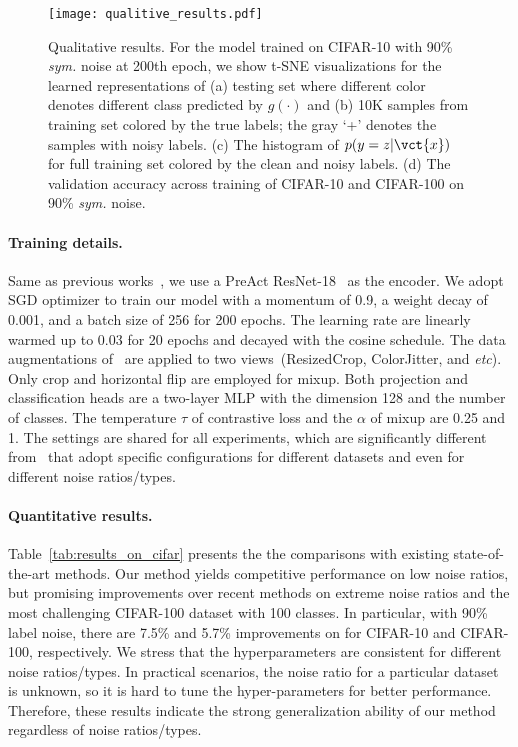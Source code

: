 \begin{figure*}[t]
    \centering
    \texttt{[image: qualitive\_results.pdf]}
    \caption{
        Qualitative results.
        For the model trained on CIFAR-10 with 90\% \textit{sym.} noise at 200th epoch, we show t-SNE visualizations for the learned representations of (a) testing set where different color denotes different class predicted by $g(\cdot)$ and (b) 10K samples from training set colored by the true labels; the gray `+' denotes the samples with noisy labels.  (c) The histogram of $p(y=z|\vct{x})$ for full training set colored by the clean and noisy labels. (d) The validation accuracy across training of CIFAR-10 and CIFAR-100 on 90\% \textit{sym.} noise.
    }
    \label{fig:qualitive_results}
\end{figure*}

\paragraph{Training details.} 
Same as previous works~\cite{ortego2021multi,li2020dividemix,li2021learning,liu2020early}, we use a PreAct ResNet-18~\cite{he2016identity} as the encoder. We adopt SGD optimizer to train our model with a momentum of 0.9, a weight decay of 0.001, and a batch size of 256 for 200 epochs. The learning rate are linearly warmed up to 0.03 for 20 epochs and decayed with the cosine schedule.
The data augmentations of~\cite{chen2020simple} are applied to two views~(ResizedCrop, ColorJitter, and \textit{etc}). Only crop and horizontal flip are employed for mixup. Both projection and classification heads are a two-layer MLP with the dimension 128 and the number of classes. The temperature $\tau$ of contrastive loss and the $\alpha$ of mixup are 0.25 and 1. The settings are shared for all experiments, which are significantly different from~\cite{li2020dividemix,li2021learning,liu2020early} that adopt specific configurations for different datasets and even for different noise ratios/types.

\paragraph{Quantitative results.}
Table~\ref{tab:results_on_cifar} presents the the comparisons with existing state-of-the-art methods. Our method yields competitive performance on low noise ratios, but promising improvements over recent methods on extreme noise ratios and the most challenging CIFAR-100 dataset with 100 classes. In particular, with 90\% label noise, there are 7.5\% and 5.7\% improvements on for CIFAR-10 and CIFAR-100, respectively. We stress that the hyperparameters are consistent for different noise ratios/types. In practical scenarios, the noise ratio for a particular dataset is unknown, so it is hard to tune the hyper-parameters for better performance. Therefore, these results indicate the strong generalization ability of our method regardless of noise ratios/types.

